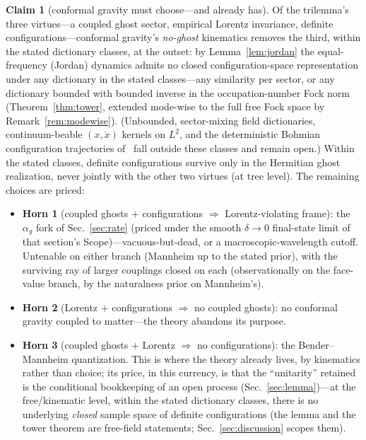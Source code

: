 \documentclass[11pt]{article}
\theoremstyle{definition}
\newtheorem{claim}[theorem]{Claim}
\theoremstyle{remark}
\newcommand{\ag}{\alpha_g}
\begin{document}
\begin{claim}[conformal gravity must choose---and already has]
\label{claim:choose}
Of the trilemma's three virtues---a coupled ghost sector, empirical
Lorentz invariance, definite configurations---conformal gravity's
\emph{no-ghost} kinematics removes the third, within the stated
dictionary classes, at the outset:
by Lemma~\ref{lem:jordan} the equal-frequency (Jordan) dynamics
admits
no closed configuration-space representation under any dictionary in the
stated classes---any similarity per sector, or any dictionary bounded with
bounded inverse in the occupation-number Fock norm (Theorem~\ref{thm:tower}, extended mode-wise to the full free Fock space by Remark~\ref{rem:modewise}). (Unbounded,
sector-mixing field dictionaries, continuum-beable $(x,\dot x)$ kernels on
$L^{2}$, and the deterministic Bohmian configuration trajectories
of~\cite{DeyFring2026} fall outside these classes and remain open.) Within the stated classes, definite
configurations survive only in the Hermitian ghost realization,
never jointly with the other two virtues (at tree level).
The remaining choices are priced:
\begin{itemize}
\item \textbf{Horn 1} (coupled ghosts $+$ configurations $\Rightarrow$
  Lorentz-violating frame): the $\ag$ fork of
  Sec.~\ref{sec:rate} (priced under the smooth $\delta\to0$ final-state
  limit of that section's Scope)---vacuous-but-dead, or a
  macroscopic-wavelength cutoff. Untenable on either branch (Mannheim up to the stated prior), with the surviving ray of larger
  couplings closed on each (observationally on the face-value branch, by the
  naturalness prior on Mannheim's).
\item \textbf{Horn 2} (Lorentz $+$ configurations $\Rightarrow$ no
  coupled ghosts): no conformal gravity coupled to matter---the
  theory abandons its purpose.
\item \textbf{Horn 3} (coupled ghosts $+$ Lorentz $\Rightarrow$ no
  configurations): the Bender--Mannheim quantization. This is where
  the theory already lives, by kinematics rather than choice; its
  price, in this currency, is that the ``unitarity'' retained is the
  conditional bookkeeping of an open process
  (Sec.~\ref{sec:lemma})---at the free/kinematic level, within the stated
  dictionary classes, there is no
  underlying \emph{closed} sample space of definite configurations (the lemma and the tower theorem
  are free-field statements; Sec.~\ref{sec:discussion} scopes them).
\end{itemize}
\end{claim}
\end{document}
